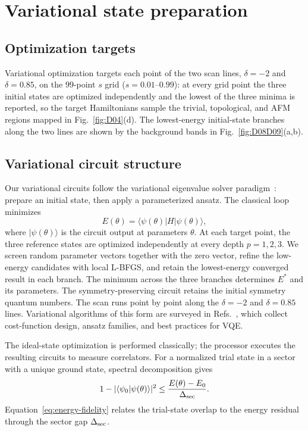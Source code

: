\section{Variational state preparation}
\label{sec:ansatz}

\subsection{Optimization targets}
\label{sec:points}

Variational optimization targets each point of the two scan lines, $\delta=-2$ and $\delta=0.85$, on the $99$-point $s$ grid ($s=0.01$--$0.99$): at every grid point the three initial states are optimized independently and the lowest of the three minima is reported, so the target Hamiltonians sample the trivial, topological, and AFM regions mapped in Fig.~\ref{fig:D04}(d). The lowest-energy initial-state branches along the two lines are shown by the background bands in Fig.~\ref{fig:D08D09}(a,b).

\subsection{Variational circuit structure}

Our variational circuits follow the variational eigenvalue solver
paradigm~\cite{peruzzo2014variational}: prepare an initial state, then
apply a parameterized ansatz. The classical loop minimizes
\begin{equation}
E(\theta)=\langle\psi(\theta)|H|\psi(\theta)\rangle,
\end{equation}
where $|\psi(\theta)\rangle$ is the circuit output at parameters
$\theta$. At each target point, the three reference states are optimized independently at every depth $p=1,2,3$.
We screen random parameter vectors together with the zero vector, refine the low-energy candidates with local L-BFGS, and retain the lowest-energy converged result in each branch.
The minimum across the three branches determines $E^*$ and its parameters.
The symmetry-preserving circuit retains the initial symmetry quantum numbers.
The scan runs point by point along the $\delta=-2$ and $\delta=0.85$ lines. Variational algorithms of this form are surveyed in
Refs.~\cite{cerezo2021variational,tilly2022variational}, which collect
cost-function design, ansatz families, and best practices for VQE.

The ideal-state optimization is performed classically; the processor executes the resulting circuits to measure correlators.
For a normalized trial state in a sector with a unique ground state, spectral decomposition gives
\begin{equation}
1-|\langle\psi_0|\psi(\theta)\rangle|^2
\leq \frac{E(\theta)-E_0}{\Delta_{\rm sec}}.
\label{eq:energy-fidelity}
\end{equation}
Equation~\eqref{eq:energy-fidelity} relates the trial-state overlap to the energy residual through the sector gap $\Delta_{\rm sec}$.


